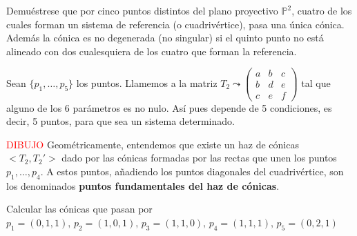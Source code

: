\begin{ejer}
    [8] Demu\'estrese que por cinco puntos distintos del plano proyectivo $\mathbb P^2$, cuatro de los cuales forman un sistema de referencia (o cuadriv\'ertice), pasa una \'unica c\'onica. Adem\'as la c\'onica es no degenerada (no singular) si el quinto punto no est\'a alineado con dos cualesquiera de los cuatro que forman la referencia.
\end{ejer}
\begin{sol}
    Sean $\{p_1,\ldots, p_5\}$ los puntos. Llamemos a la matriz $T_2 \leadsto \left( \begin{smallmatrix}
        a & b & c \\ b & d & e \\ c& e & f
    \end{smallmatrix}\right)$ tal que alguno de los 6 par\'ametros es no nulo. As\'i pues depende de 5 condiciones, es decir, 5 puntos, para que sea un sistema determinado. 

    \textcolor{red}{DIBUJO}
    Geom\'etricamente, entendemos que existe un haz de c\'onicas $<T_2,T_2'>$ dado por las c\'onicas formadas por las rectas que unen los puntos $p_1, \ldots, p_4$. A estos puntos, añadiendo los puntos diagonales del cuadrivértice, son los denominados \textbf{puntos fundamentales del haz de cónicas}.
\end{sol}
\begin{ejer}[9]
    Calcular las cónicas que pasan por $p_1=(0,1,1), \, p_2=(1,0,1), \, p_3=(1,1,0), \, p_4=(1,1,1), \, p_5=(0,2,1)$
\end{ejer}
